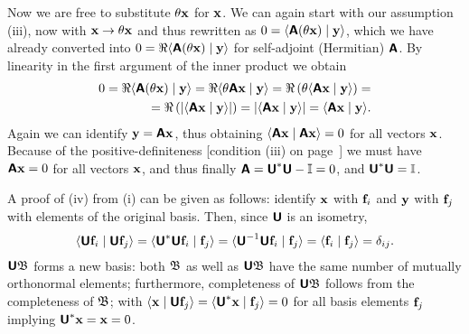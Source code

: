 {Now we are free to substitute  $\theta   {\bf x}$ for ${\bf x}$.
We can again start with our assumption (iii), now with  ${\bf x} \rightarrow \theta   {\bf x}$ and thus
rewritten as $0 =
\langle \textsf{\textbf{A}} (\theta   {\bf x}) \mid {\bf y} \rangle $, which we have already converted into
$0
=\Re  \langle \textsf{\textbf{A}} (\theta    {\bf x}) \mid {\bf y} \rangle$
for self-adjoint (Hermitian) $\textsf{\textbf{A}}$.
By linearity in the first argument of the inner product we obtain
\begin{equation}
\begin{split}
0
=\Re  \langle \textsf{\textbf{A}} (\theta    {\bf x}) \mid {\bf y} \rangle
=\Re  \langle  \theta  \textsf{\textbf{A}}   {\bf x}  \mid {\bf y} \rangle
=\Re   \left( \theta   \langle \textsf{\textbf{A}}   {\bf x} \mid {\bf y} \rangle      \right) =\\
=\Re \left( \vert \langle \textsf{\textbf{A}}   {\bf x} \mid {\bf y} \rangle    \vert  \right)
=  \vert \langle \textsf{\textbf{A}}   {\bf x} \mid {\bf y} \rangle    \vert
=   \langle \textsf{\textbf{A}}   {\bf x} \mid {\bf y} \rangle  .
\end{split}
\label{2016-m-ch-uniteq7}
\end{equation}
Again we can  identify ${\bf y} = \textsf{\textbf{A}} {\bf x}$, thus obtaining
$\langle \textsf{\textbf{A}} {\bf x} \mid \textsf{\textbf{A}} {\bf x}  \rangle  =0$
for all vectors ${\bf x}$.
Because of the positive-definiteness
[condition (iii) on page~\pageref{2016-m-ch-fdvs-pd}]
we must have $ \textsf{\textbf{A}} {\bf x}  =0$
for all vectors ${\bf x}$, and thus finally
$\textsf{\textbf{A}}= \textsf{\textbf{U}}^\ast\textsf{\textbf{U}} - {\Bbb I} =0$,
and $\textsf{\textbf{U}}^\ast\textsf{\textbf{U}} = {\Bbb I}$.


A proof of (iv) from (i) can be given as follows:
identify
${\bf x}$ with ${\bf f}_i$
and
${\bf y}$ with ${\bf f}_j$ with elements of the original basis.
Then, since $\textsf{\textbf{U}}$ is an isometry,
\begin{equation}
\begin{split}
\langle \textsf{\textbf{U}} {\bf f}_i \mid \textsf{\textbf{U}}  {\bf f}_j  \rangle
=
\langle \textsf{\textbf{U}}^\ast \textsf{\textbf{U}} {\bf f}_i \mid  {\bf f}_j  \rangle
=
\langle \textsf{\textbf{U}}^{-1}\textsf{\textbf{U}} {\bf f}_i \mid  {\bf f}_j  \rangle
=
\langle  {\bf f}_i \mid  {\bf f}_j  \rangle = \delta_{ij}.
\end{split}
\label{2016-m-ch-uniteq71}
\end{equation}
$ \textsf{\textbf{U}} {\frak B} $
forms a new basis: both $  {\frak B} $ as well as $ \textsf{\textbf{U}} {\frak B} $
have the same number of mutually orthonormal elements; furthermore, completeness of $ \textsf{\textbf{U}} {\frak B} $
follows from the completeness of $ {\frak B} $; with
$
\langle  {\bf x} \mid \textsf{\textbf{U}} {\bf f}_j  \rangle
=
\langle  \textsf{\textbf{U}}^\ast  {\bf x} \mid {\bf f}_j  \rangle
=0
$ for all basis elements ${\bf f}_j$ implying $ \textsf{\textbf{U}}^\ast  {\bf x} = {\bf x} = 0$.

}
